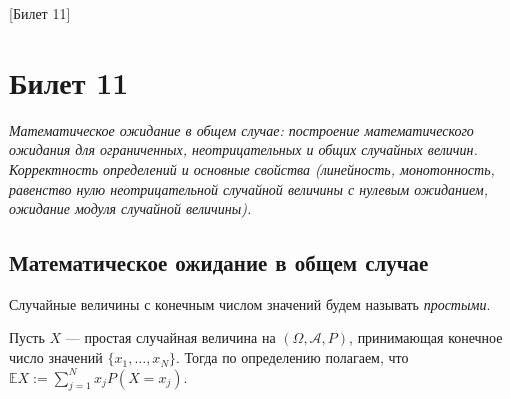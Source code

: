 [Билет 11]

\section{Билет 11}

\begin{center}
    \it Математическое ожидание в общем случае: построение математического ожидания для ограниченных, неотрицательных и общих случайных величин.
    Корректность определений и основные свойства (линейность, монотонность, равенство нулю неотрицательной случайной величины с нулевым ожиданием, ожидание модуля случайной величины).
\end{center}

\sectionbreak
\subsection{Математическое ожидание в общем случае}

\begin{definition*}
    Случайные величины с конечным числом значений будем называть {\it простыми}.
\end{definition*}

\begin{definition*}
    Пусть $X$ --- простая случайная величина на $(\Omega, \mathcal{A}, P)$, принимающая конечное число значений $\{x_1, \ldots, x_N\}$.
    Тогда по определению полагаем, что $\mathbb{E} X := \sum\limits_{j = 1}^{N} x_j P(X = x_j)$.
\end{definition*}


